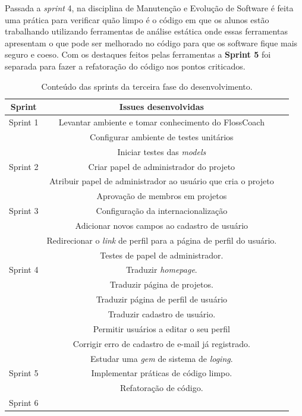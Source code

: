 Passada a \textit{sprint} 4, na disciplina de Manutenção e Evolução de Software é feita uma prática
para verificar quão limpo é o código em que os alunos estão trabalhando utilizando
ferramentas de análise estática onde essas ferramentas apresentam o que pode ser melhorado 
no código para que os software fique mais seguro e coeso. Com os destaques feitos pelas
ferramentas a \textbf{Sprint 5} foi separada para fazer a refatoração do código
nos pontos criticados.


\begin{table}[h]
	\centering
	\begin{tabular}{ccc}
		\toprule
		\textbf{Sprint} & \textbf{Issues desenvolvidas} \\
		\midrule
		Sprint 1 & Levantar ambiente e tomar conhecimento do FlossCoach \\
			 & Configurar ambiente de testes unitários \\
			 & Iniciar testes das \textit{models}\\
		\midrule
		Sprint 2 & Criar papel de administrador do projeto\\
			 & Atribuir papel de administrador ao usuário que cria o projeto \\
			 & Aprovação de membros em projetos \\
		\midrule		
		Sprint 3 & Configuração da internacionalização \\
			 & Adicionar novos campos ao cadastro de usuário\\
			 & Redirecionar o \textit{link} de perfil para a página de perfil do usuário.\\
			 & Testes de papel de administrador.\\
		\midrule		
		Sprint 4 & Traduzir \textit{homepage}.\\
			 & Traduzir página de projetos.\\
			 & Traduzir página de perfil de usuário\\
			 & Traduzir cadastro de usuário.\\ 
			 & Permitir usuários a editar o seu perfil\\
			 & Corrigir erro de cadastro de e-mail já registrado.\\
			 & Estudar uma \textit{gem} de sistema de \textit{loging}.\\  
		\midrule		
		Sprint 5 & Implementar práticas de código limpo.\\
			 & Refatoração de código.\\
	
		\midrule
		Sprint 6 &\\
		\bottomrule
	\end{tabular}

	\caption{Conteúdo das sprints da terceira fase do desenvolvimento.}
	\label{issues}
\end{table}

